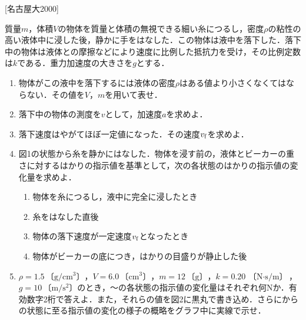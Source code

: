 

\noindent
{} [名古屋大2000]

質量$m$，体積$V$の物体を質量と体積の無視できる細い糸につるし，密度$\rho$の粘性の高い液体中に浸した後，静かに手をはなした．この物体は液中を落下した．落下中の物体は液体との摩擦などにより速度に比例した抵抗力を受け，その比例定数は$k$である．重力加速度の大きさを$g$とする．

\begin{enumerate}[(1)]
  \item {\hzw}物体がこの液中を落下するには液体の密度$\rho$はある値より小さくなくてはならない．その値を$V$，$m$を用いて表せ．
  \item {\hzw}落下中の物体の測度を$v$として，加速度$a$を求めよ．
  \item {\hzw}落下速度はやがてほぼ一定値になった．その速度$v_\mathrm{f}$を求めよ．
  \item {\hzw}図1の状態から糸を静かにはなした．物体を浸す前の，液体とビーカーの重さに対するはかりの指示値を基準として，次の各状態のはかりの指示値の変化量を求めよ．
  \begin{enumerate}[label=\ctext{\arabic*}]
    \item {\hzw}物体を糸につるし，液中に完全に浸したとき
    \item {\hzw}糸をはなした直後
    \item {\hzw}物体の落下速度が一定速度$v_\mathrm{f}$となったとき
    \item {\hzw}物体がビーカーの底につき，はかりの目盛りが静止した後
  \end{enumerate}
  \item {\hzw}$\rho = 1.5 \,\text{〔g/cm${}^3$〕}$，$V = 6.0\, \text{〔cm${}^3$〕}$，$m = 12 \, \text{〔g〕}$，$k = 0.20\, \text{〔N$\cdot$s/m〕}$，$g = 10\, \text{〔m/s${}^2$〕}$のとき，〜の各状態の指示値の変化量はそれぞれ何Nか．有効数字2桁で答えよ．また，それらの値を図2に黒丸で書き込め．さらにからの状態に至る指示値の変化の様子の概略をグラフ中に実線で示せ．
\end{enumerate}
